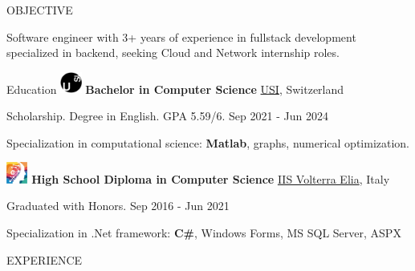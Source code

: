 \documentclass{cv} %
\def\intraexpvspace{0.15cm}
\begin{document}
\begin{minipage}[b][0.9\paperheight][t]{0.7\linewidth}

    \headline

\begin{rSection}{OBJECTIVE}
    \item Software engineer with 3+ years of experience in fullstack development specialized in backend, 
    seeking Cloud and Network internship roles.
\end{rSection}

\begin{rSection}{Education}
    \vspace{0.2cm}
    \includegraphics[width=0.7cm, trim={0cm 10cm 0cm 0cm}]{usi-icon.png}
    {\bf Bachelor in Computer Science}
    \hfill \href{https://www.usi.ch/en}{USI}, Switzerland
    \item \hspace{0.85cm}Scholarship. Degree in English. GPA 5.59/6. 
    \hfill {Sep 2021 - Jun 2024} 
    \item Specialization in computational science: \textbf{Matlab}, graphs, numerical optimization.
    \vspace{\intraexpvspace}
    \vspace{\intraexpvspace}

    \includegraphics[width=0.7cm, trim={0cm 2.2cm 0cm 0cm}]{iisve-icon.png}
    {\bf High School Diploma in Computer Science}
    \hfill \href{https://www.istitutovolterraelia.it/}{IIS Volterra Elia}, Italy
    \item \hspace{0.85cm}Graduated with Honors.
    \hfill {Sep 2016 - Jun 2021} 
    \item Specialization in .Net framework: \textbf{C\#}, Windows Forms, MS SQL Server, ASPX
\end{rSection}
\begin{rSection}{EXPERIENCE}
    \vspace{0.2cm}


\end{rSection}
\end{minipage}
\end{document}

